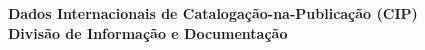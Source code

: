 
\noindent\textbf{Dados Internacionais de Catalogação-na-Publicação (CIP)\\
Divisão de Informação e Documentação}



